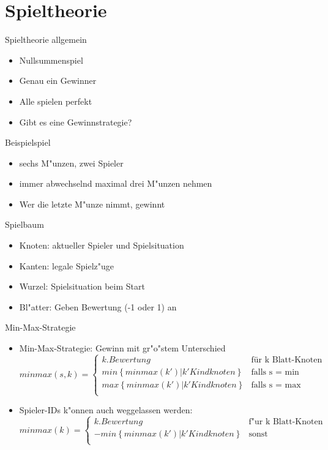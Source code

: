 \documentclass[18pt]{beamer}
\begin{document}
\section{Spieltheorie}
\begin{frame}{Spieltheorie allgemein}
\begin{itemize}
\item Nullsummenspiel
\pause
\item Genau ein Gewinner
\pause
\item Alle spielen perfekt
\pause
\item Gibt es eine Gewinnstrategie?
\end{itemize}
\end{frame}

\begin{frame}{Beispielspiel}
\begin{itemize}
\item sechs M"unzen, zwei Spieler
\pause
\item immer abwechselnd maximal drei M"unzen nehmen
\pause
\item Wer die letzte M"unze nimmt, gewinnt
\end{itemize}
\end{frame}

\begin{frame}{Spielbaum}
\begin{itemize}
\item Knoten: aktueller Spieler und Spielsituation
\pause
\item Kanten: legale Spielz"uge
\pause
\item Wurzel: Spielsituation beim Start
\pause
\item Bl"atter: Geben Bewertung (-1 oder 1) an
\pause
\end{itemize}
\end{frame}

\begin{frame}{Min-Max-Strategie}
\begin{itemize}
\item Min-Max-Strategie: Gewinn mit gr"o"stem Unterschied
\begin{equation}
   minmax(s,k) =
   \begin{cases}
     k.Bewertung & \text{für k Blatt-Knoten} \\
     min\left\{minmax(k') | k' Kindknoten\right\} & \text{falls s = min} \\
     max\left\{minmax(k') | k' Kindknoten\right\} & \text{falls s = max} \\
   \end{cases}
\end{equation}
\pause
\item Spieler-IDs k"onnen auch weggelassen werden: 
\begin{equation}
   minmax(k) =
   \begin{cases}
     k.Bewertung & \text{f"ur k Blatt-Knoten} \\
     - min\left\{minmax(k') | k' Kindknoten\right\} & \text{sonst} \\
   \end{cases}
\end{equation}
\end{itemize}
\end{frame}
\end{document}

